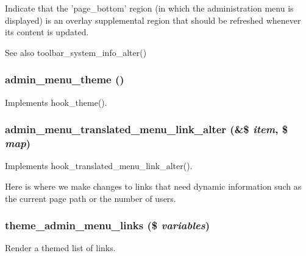 Indicate that the 'page\_\-bottom' region (in which the administration menu is displayed) is an overlay supplemental region that should be refreshed whenever its content is updated.

\begin{DoxySeeAlso}{See also}
toolbar\_\-system\_\-info\_\-alter() 
\end{DoxySeeAlso}
\hypertarget{admin__menu_8module_a7d7afd748df0dc6b8f912122cab9990c}{
\subsubsection[{admin\_\-menu\_\-theme}]{\setlength{\rightskip}{0pt plus 5cm}admin\_\-menu\_\-theme ()}}
\label{admin__menu_8module_a7d7afd748df0dc6b8f912122cab9990c}
Implements hook\_\-theme(). \hypertarget{admin__menu_8module_a6fe2d9b57846191f435845489259ddde}{
\subsubsection[{admin\_\-menu\_\-translated\_\-menu\_\-link\_\-alter}]{\setlength{\rightskip}{0pt plus 5cm}admin\_\-menu\_\-translated\_\-menu\_\-link\_\-alter (\&\$ {\em item}, \/  \$ {\em map})}}
\label{admin__menu_8module_a6fe2d9b57846191f435845489259ddde}
Implements hook\_\-translated\_\-menu\_\-link\_\-alter().

Here is where we make changes to links that need dynamic information such as the current page path or the number of users. \hypertarget{admin__menu_8module_a33d1120bbd0ebf32f21f44c17b831475}{
\subsubsection[{theme\_\-admin\_\-menu\_\-links}]{\setlength{\rightskip}{0pt plus 5cm}theme\_\-admin\_\-menu\_\-links (\$ {\em variables})}}
\label{admin__menu_8module_a33d1120bbd0ebf32f21f44c17b831475}
Render a themed list of links.


